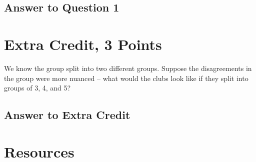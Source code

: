 \documentclass{article}
\begin{document}
\subsection*{Answer to Question 1}



\newpage

\section*{Extra Credit, 3 Points}

We know the group split into two different groups. Suppose the disagreements in the group were more nuanced -- what would the clubs look like if they split into groups of 3, 4, and 5?


\subsection*{Answer to Extra Credit}





\newpage

\section*{Resources}
\end{document}
